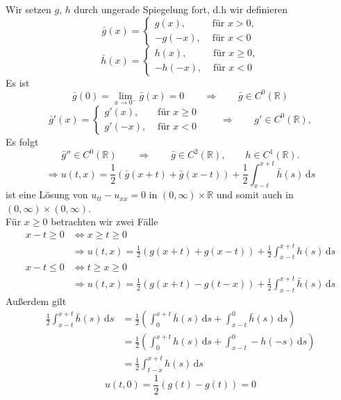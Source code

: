 \begin{beweis}

Wir setzen $g$, $h$ durch ungerade Spiegelung fort, d.h wir definieren
\[
	\bar{g} (x) = \begin{cases}
		g(x), &\text{ für }x > 0,\\
		-g(-x), &\text{ für }x <0
		
	\end{cases}
\]
\[
	\bar{h} (x) = \begin{cases}
		h(x), &\text{ für }x \geq 0,\\
		-h(-x), &\text{ für }x <0
		
	\end{cases}
\]
Es ist
\[
	\bar{g} (0) = \lim_{x \to 0^-} \bar{g} (x) = 0 \qquad \Rightarrow \qquad \bar{g} \in C^0(\mathbb{R})
\]
\[
	\bar{g}'(x) = \begin{cases}
		g'(x), &\text{ für }x \geq 0\\
		g'(-x), &\text{ für }x <0
		
	\end{cases} \qquad \Rightarrow \qquad g' \in C^0(\mathbb{R}),
\]	
Es folgt
\[
	\bar{g}'' \in C^0(\mathbb{R}) \qquad \Rightarrow \qquad \bar{g} \in C^2(\mathbb{R}), \qquad h \in C^1(\mathbb{R}).
\]
\[
	\Rightarrow u(t,x) = \frac{1}{2} (\bar{g} (x+t) + \bar{g}(x-t)) + \frac{1}{2} \int_{x-t}^{x+t} \bar{h}(s) \,\mathrm{d}s
\]
ist eine Lösung von $u_{tt}- u_{xx} =0$ in $(0,\infty) \times \mathbb{R}$ und somit auch in $(0, \infty) \times (0, \infty)$. \\
Für $x \geq 0$ betrachten wir zwei Fälle
\begin{align*}
	x-t \geq 0 & \Leftrightarrow x \geq t \geq 0 \\
	& \Rightarrow u(t,x)= \frac{1}{2} (g(x+t) + g(x-t)) + \frac{1}{2} \int_{x-t}^{x+t} h(s) \,\mathrm{d}s
\end{align*}
\begin{align*}
	x-t \leq  0 & \Leftrightarrow t \geq x \geq 0 \\
	& \Rightarrow u(t,x)= \frac{1}{2} (g(x+t) - g(t-x)) + \frac{1}{2} \int_{x-t}^{x+t} \bar{h}(s) \,\mathrm{d}s
\end{align*}
Außerdem gilt
\begin{align*}
	\frac{1}{2} \int_{x-t}^{x+t} \bar{h}(s) \,\mathrm{d}s &= \frac{1}{2} \left( \int_{0}^{x+t}\bar{h}(s) \,\mathrm{d}s + \int_{x-t}^{0} \bar{h}(s) \,\mathrm{d}s \right)
	\\ &= \frac{1}{2} \left( \int_{0}^{x+t}h(s) \,\mathrm{d}s + \int_{x-t}^{0}-h(-s) \,\mathrm{d}s \right) \\ &= \frac{1}{2} \int_{t-x}^{x+t}h(s) \,\mathrm{d}s
\end{align*}
\[
	u(t,0) = \frac{1}{2} (g(t) -g(t)) = 0
\]
\end{beweis}


